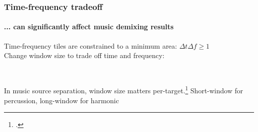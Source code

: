 \documentclass[usenames,dvipsnames]{beamer}
\begin{document}
\begin{frame}
	\frametitle{Time-frequency tradeoff}
	\framesubtitle{... can significantly affect music demixing results}
	Time-frequency tiles are constrained to a minimum area: $\Delta t\Delta f \ge 1 $\\Change window size to trade off time and frequency:
	\begin{figure}[ht]
		\centering
		\vspace{-1.5em}
		\\
		\vspace{-1em}
		\vspace{-1.25em}
	\end{figure}
	In music source separation, window size matters per-target.\footcite{tftradeoff1, tftradeoff2} Short-window for percussion, long-window for harmonic
\end{frame}
\end{document}
